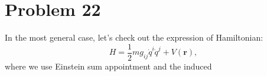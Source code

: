 \section*{Problem 22}

In the most general case, let's check out the expression of Hamiltonian:
\begin{equation}
    H = \frac{1}{2} m g_{ij} \dot{q}^i \dot{q}^j  +  V\left(\boldsymbol{r}\right),
\end{equation}
where we use Einstein sum appointment and the induced 